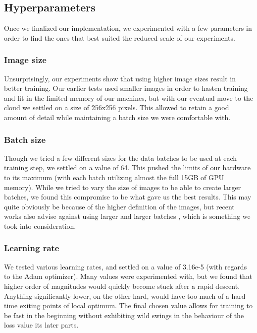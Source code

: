 \documentclass[twoside,twocolumn]{article}
\begin{document}
\subsection{Hyperparameters}

Once we finalized our implementation, we experimented with a few parameters in order to find the ones that best suited the reduced scale of our experiments.

\subsubsection{Image size}
Unsurprisingly, our experiments show that using higher image sizes result in better training. Our earlier tests used smaller images in order to hasten training and fit in the limited memory of our machines, but with our eventual move to the cloud we settled on a size of 256x256 pixels. This allowed to retain a good amount of detail while maintaining a batch size we were comfortable with.

\subsubsection{Batch size}
Though we tried a few different sizes for the data batches to be used at each training step, we settled on a value of 64. This pushed the limits of our hardware to its maximum (with each batch utilizing almost the full 15GB of GPU memory). While we tried to vary the size of images to be able to create larger batches, we found this compromise to be what gave us the best results. This may quite obviously be because of the higher definition of the images, but recent works also advise against using larger and larger batches \cite{Nitish:2017}, which is something we took into consideration.

\subsubsection{Learning rate}
We tested various learning rates, and settled on a value of  3.16e-5 (with regards to the Adam optimizer). Many values were experimented with, but we found that higher order of magnitudes would quickly become stuck after a rapid descent. Anything significantly lower, on the other hard, would have too much of a hard time exiting points of local optimum.
The final chosen value allows for training to be fast in the beginning without exhibiting wild swings in the behaviour of the loss value its later parts.
\end{document}
